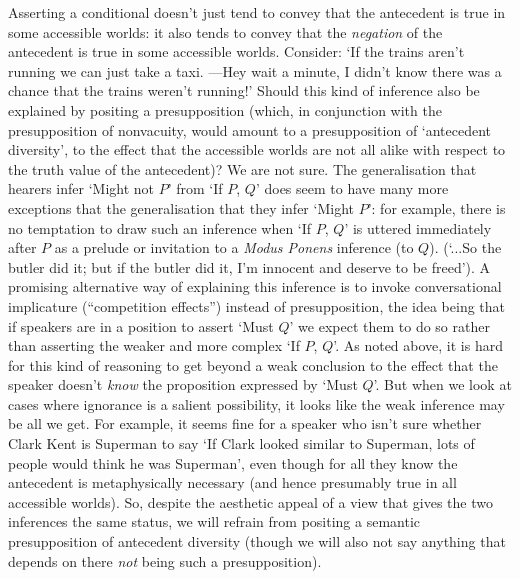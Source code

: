 \documentclass[If.tex]{subfiles}
\begin{document}
Asserting a conditional doesn't just tend to convey that the antecedent is true in some accessible worlds: it also tends to convey that the \emph{negation} of the antecedent is true in some accessible worlds.  Consider: ‘If the trains aren't running we can just take a taxi.  ---Hey wait a minute, I didn't know there was a chance that the trains weren't running!’  Should this kind of inference also be explained by positing a presupposition (which, in conjunction with the presupposition of nonvacuity, would amount to a presupposition of ‘antecedent diversity’, to the effect that the accessible worlds are not all alike with respect to the truth value of the antecedent)?  We are not sure.  The generalisation that hearers infer ‘Might not $P$’ from ‘If $P$, $Q$’ does seem to have many more exceptions that the generalisation that they infer ‘Might $P$’: for example, there is no temptation to draw such an inference when ‘If $P$, $Q$’ is uttered immediately after $P$ as a prelude or invitation to a \emph{Modus Ponens} inference (to $Q$).  (‘...So the butler did it; but if the butler did it, I'm innocent and deserve to be freed’).  A promising alternative way of explaining this inference is to invoke conversational implicature (“competition effects”) instead of presupposition, the idea being that if speakers are in a position to assert ‘Must $Q$’ we expect them to do so rather than asserting the weaker and more complex ‘If $P$, $Q$’.  As noted above, it is hard for this kind of reasoning to get beyond a weak conclusion to the effect that the speaker doesn't \emph{know} the proposition expressed by ‘Must $Q$’.  But when we look at cases where ignorance is a salient possibility, it looks like the weak inference may be all we get.  For example, it seems fine for a speaker who isn't sure whether Clark Kent is Superman to say ‘If Clark looked similar to Superman, lots of people would think he was Superman’, even though for all they know the antecedent is metaphysically necessary (and hence presumably true in all accessible worlds).  So, despite the aesthetic appeal of a view that gives the two inferences the same status, we will refrain from positing a semantic presupposition of antecedent diversity (though we will also not say anything that depends on there \emph{not} being such a presupposition).
\end{document}
